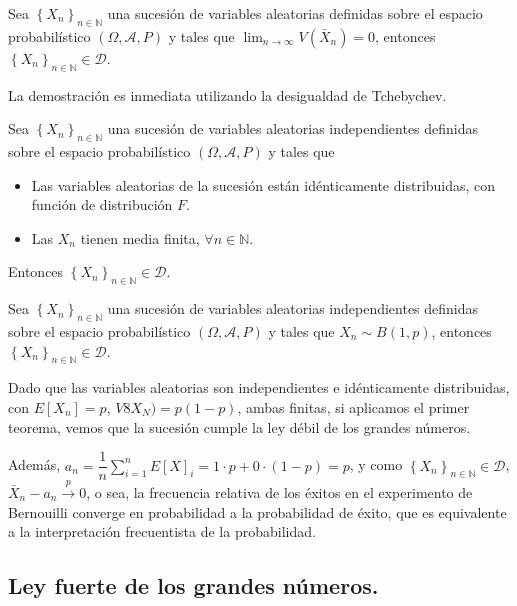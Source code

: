 \begin{teorema}[Markov]
Sea $ \left\{X_n\right\}_{n\in\mathbb{N}}$ una sucesi\'on de variables aleatorias definidas sobre el espacio probabil\'istico $\left(\Omega,\mathcal{A}, P\right) $ y tales que $\lim_{n\to\infty}V(\bar{X}_n)=0$, entonces $ \left\{X_n\right\}_{n\in\mathbb{N}}\in\mathscr{D}$.
\end{teorema}

La demostraci\'on es inmediata utilizando la desigualdad de Tchebychev.

\begin{teorema}[Khintchine]
Sea $ \left\{X_n\right\}_{n\in\mathbb{N}}$ una sucesi\'on de variables aleatorias independientes definidas sobre el espacio probabil\'istico $\left(\Omega,\mathcal{A}, P\right) $ y tales que 
\begin{itemize}
\item Las variables aleatorias de la sucesi\'on est\'an id\'enticamente distribuidas, con funci\'on de distribuci\'on $F$.
\item Las $X_n$ tienen media finita, $\forall n\in\mathbb{N}$.
\end{itemize}
Entonces $ \left\{X_n\right\}_{n\in\mathbb{N}}\in\mathscr{D}$.
\end{teorema}

\begin{teorema}
Sea $ \left\{X_n\right\}_{n\in\mathbb{N}}$ una sucesi\'on de variables aleatorias independientes definidas sobre el espacio probabil\'istico $\left(\Omega,\mathcal{A}, P\right) $ y tales que $X_n\sim B(1,p)$, entonces $ \left\{X_n\right\}_{n\in\mathbb{N}}\in\mathscr{D}$.
\end{teorema}

Dado que las variables aleatorias son independientes e id\'enticamente distribuidas, con $E[X_n]=p$, $V8X_N)=p(1-p)$, ambas finitas, si aplicamos el primer teorema, vemos que la sucesi\'on cumple la ley d\'ebil de los grandes n\'umeros.

Adem\'as, $a_n=\dfrac{1}{n}\sum_{i=1}^{n}E[X]_i=1\cdot p + 0\cdot(1-p)=p$, y como $ \left\{X_n\right\}_{n\in\mathbb{N}}\in\mathscr{D}$, $ \bar{X}_n-a_n\overset{p}{\to} 0$, o sea, la frecuencia relativa de los \'exitos en el experimento de Bernouilli converge en probabilidad a la probabilidad de \'exito, que es equivalente a la interpretaci\'on frecuentista de la probabilidad.

\subsection{Ley fuerte de los grandes n\'umeros.}

